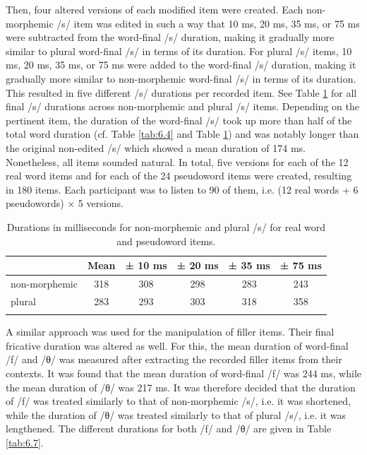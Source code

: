 Then, four altered versions of each modified item were created. Each non-morphemic /s/ item was edited in such a way that 10 ms, 20 ms, 35 ms, or 75 ms were subtracted from the word-final /s/ duration, making it gradually more similar to plural word-final /s/ in terms of its duration. For plural /s/ items, 10 ms, 20 ms, 35 ms, or 75 ms were added to the word-final /s/ duration, making it gradually more similar to non-morphemic word-final /s/ in terms of its duration. This resulted in five different /s/ durations per recorded item. See Table \ref{tab:6.6} for all final /s/ durations across non-morphemic and plural /s/ items. Depending on the pertinent item, the duration of the word-final /s/ took up more than half of the total word duration (cf. Table \ref{tab:6.4} and Table \ref{tab:6.6}) and was notably longer than the original non-edited /s/ which showed a mean duration of 174 ms. Nonetheless, all items sounded natural. In total, five versions for each of the 12 real word items and for each of the 24 pseudoword items were created, resulting in 180 items. Each participant was to listen to 90 of them, i.e. (12 real words + 6 pseudowords) × 5 versions.

\begin{table}\fontsize{10}{11}
\caption{Durations in milliseconds for non-morphemic and plural /s/ for real word and pseudoword items.}
\label{tab:6.6}
\centering
\begin{tabular}{lccccc} 
\lsptoprule
~             & Mean & ± 10 ms & ± 20 ms & ± 35 ms & ± 75 ms  \\ 
\midrule
non-morphemic & 318  & 308     & 298     & 283     & 243      \\
plural        & 283  & 293     & 303     & 318     & 358      \\
\lspbottomrule
\end{tabular}
\end{table}

A similar approach was used for the manipulation of filler items. Their final fricative duration was altered as well. For this, the mean duration of word-final /f/ and /θ/ was measured after extracting the recorded filler items from their contexts. It was found that the mean duration of word-final /f/ was 244 ms, while the mean duration of /θ/ was 217 ms. It was therefore decided that the duration of /f/ was treated similarly to that of non-morphemic /s/, i.e. it was shortened, while the duration of /θ/ was treated similarly to that of plural /s/, i.e. it was lengthened. The different durations for both /f/ and /θ/ are given in Table \ref{tab:6.7}.

